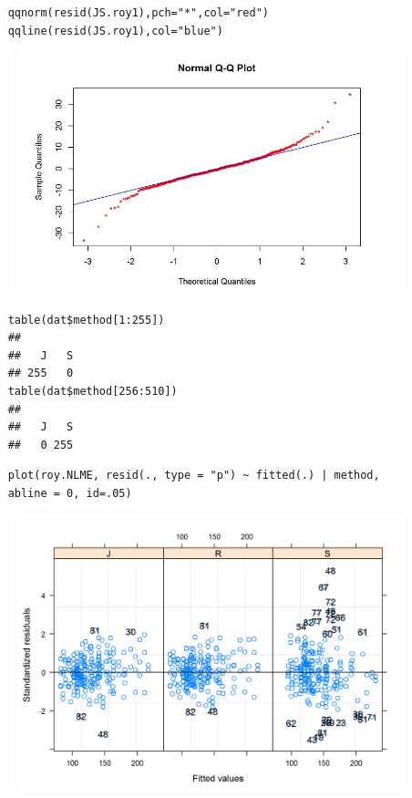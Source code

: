 \documentclass[12pt, a4paper]{report}
\theoremstyle{plain}
\theoremstyle{definition}
\theoremstyle{remark}
\begin{document}
\begin{framed}
	\begin{verbatim}
	qqnorm(resid(JS.roy1),pch="*",col="red")
	qqline(resid(JS.roy1),col="blue")
	\end{verbatim}
\end{framed}




\begin{figure}[h!]
	\centering
	\includegraphics[width=0.7\linewidth]{images/Resid-newplot}
	\caption{}
	\label{fig:Resid-newplot}
\end{figure}

\begin{framed}
	\begin{verbatim}
	table(dat$method[1:255])
	## 
	##   J   S 
	## 255   0
	table(dat$method[256:510])
	## 
	##   J   S 
	##   0 255
	\end{verbatim}	
\end{framed}
\newpage
\begin{framed}
	\begin{verbatim}
	plot(roy.NLME, resid(., type = "p") ~ fitted(.) | method, 
	abline = 0, id=.05)
	\end{verbatim}
\end{framed}
\begin{figure}
	\centering
	\includegraphics[width=0.9\linewidth]{images/bloodnlmeResidPlot2}
	\caption{}
	\label{fig:blood}
\end{figure}
\end{document}
